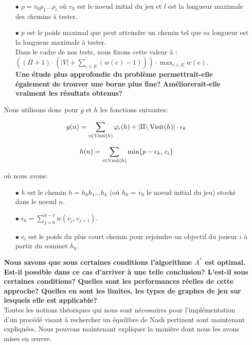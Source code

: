 \begin{itemize}
	\item[$\bullet$] $\rho = v_0 \rho_1 ... \rho_l$ où $v_0$ est le noeud initial du jeu et $l$ est la longueur maximale des chemins à tester.
	\item[$\bullet$] $p$ est le poids maximal que peut atteindre un chemin tel que sa longueur est la longueur maximale à tester.\\
	 Dans le cadre de nos tests, nous fixons cette valeur à :\linebreak $((\Pi + 1) \cdot (|V| + \sum_{e \in E} (w(e) - 1)))\cdot \max_{e \in E} w(e)$.\\ \textbf{Une étude plus approfondie du problème permettrait-elle \linebreak également de trouver une borne plus fine?} \textbf{Améliorerait-elle vraiment les résultats obtenus?}\\
\end{itemize}

Nous utilisons donc pour $g$ et $h$ les fonctions suivantes:

$$ g(n) = \sum_{i \in \operatorname*{Visit}(h)} \varphi_i(h) + |\Pi\backslash \operatorname*{Visit}(h)| \cdot \epsilon_k$$



$$h(n) = \sum_{i \in \operatorname*{Visit}(h)} \min\{ p - \epsilon_k ,\, c_i \}$$


où nous avons:

\begin{itemize}
	\item[$\bullet$] $h$ est le chemin $h = h_0 h_1 ... h_k$ (où $h_0$ = $v_0$ le noeud initial du jeu) stocké dans le noeud $n$.
	\item[$\bullet$] $\displaystyle \epsilon_k = \sum_{j = 0}^{k-1} w(v_j, v_{j+1})$.
	\item[$\bullet$] $c_i$ est le poids du plus court chemin pour rejoindre un objectif du joueur $i$ à partir du sommet $h_k$.
\end{itemize}
$ $\\
\textbf{Nous savons que sous certaines conditions l'algorithme $A^*$ est optimal. Est-il possible dans ce cas d'arriver à une telle conclusion? L'est-il sous certaines conditions? Quelles sont les performances réelles de cette approche? Quelles en sont les limites, les types de graphes de jeu sur lesquels elle est applicable?}\\
	
	
	
Toutes les notions théoriques qui nous sont nécessaires pour l'implémentation d'un procédé visant à rechercher un équilibre de Nash pertinent sont maintenant expliquées. Nous pouvons maintenant expliquer la manière dont nous les avons mises en \oe uvre.










